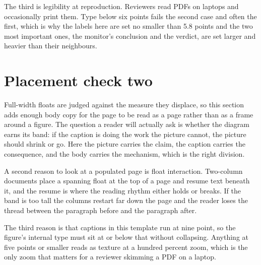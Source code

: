 \documentclass[11pt]{article}
\begin{document}
The third is legibility at reproduction. Reviewers read PDFs on laptops and
occasionally print them. Type below six points fails the second case and often
the first, which is why the labels here are set no smaller than 5.8 points and
the two most important ones, the monitor's conclusion and the verdict, are set
larger and heavier than their neighbours.


\section{Placement check two}
Full-width floats are judged against the measure they displace, so this section
adds enough body copy for the page to be read as a page rather than as a frame
around a figure. The question a reader will actually ask is whether the diagram
earns its band: if the caption is doing the work the picture cannot, the picture
should shrink or go. Here the picture carries the claim, the caption carries the
consequence, and the body carries the mechanism, which is the right division.

A second reason to look at a populated page is float interaction. Two-column
documents place a spanning float at the top of a page and resume text beneath it,
and the resume is where the reading rhythm either holds or breaks. If the band is
too tall the columns restart far down the page and the reader loses the thread
between the paragraph before and the paragraph after.

The third reason is that captions in this template run at nine point, so the
figure's internal type must sit at or below that without collapsing. Anything at
five points or smaller reads as texture at a hundred percent zoom, which is the
only zoom that matters for a reviewer skimming a PDF on a laptop.
\end{document}

